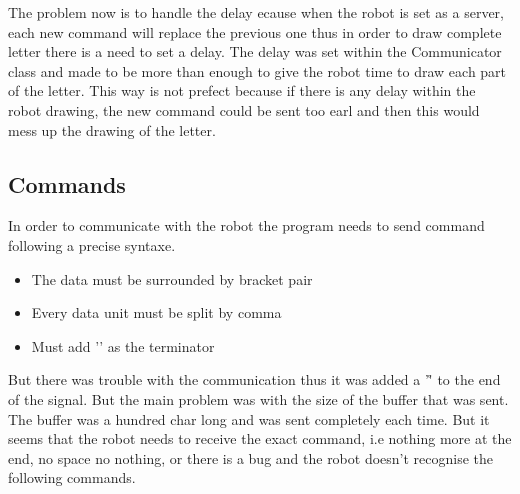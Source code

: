 The problem now is to handle the delay ecause when the robot is set as a server, each new command will replace the previous one thus in order to draw complete letter there is a need to set a delay. The delay was set within the Communicator class and made to be more than enough to give the robot time to draw each part of the letter. This way is not prefect because if there is any delay within the robot drawing, the new command could be sent too earl and then this would mess up the drawing of the letter.

\subsection{Commands}

In order to communicate with the robot the program needs to send command following a precise syntaxe.
\begin{itemize}
  \item The data must be surrounded by bracket pair
  \item Every data unit must be split by comma
  \item Must add '\n' as the terminator
\end{itemize}

But there was trouble with the communication thus it was added a '\r' to the end of the signal. But the main problem was with the size of the buffer that was sent. The buffer was a hundred char long and was sent completely each time. But it seems that the robot needs to receive the exact command, i.e nothing more at the end, no space no nothing, or there is a bug and the robot doesn't recognise the following commands. 
